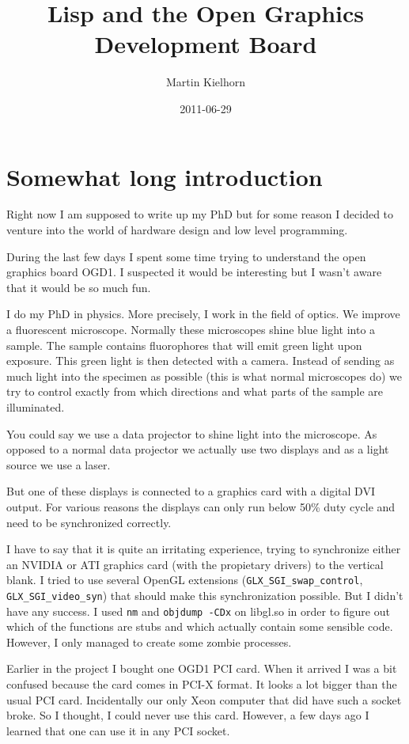 \documentclass[twocolumn,DIV19]{scrartcl}
\title{Lisp and the Open Graphics Development Board}
\author{Martin Kielhorn}
\date{2011-06-29}
\begin{document}
\maketitle 

\section{Somewhat long introduction}
Right now I am supposed to write up my PhD but for some reason I
decided to venture into the world of hardware design and low level
programming.

During the last few days I spent some time trying to understand the
open graphics board OGD1. I suspected it would be interesting but I
wasn't aware that it would be so much fun.

I do my PhD in physics. More precisely, I work in the field of
optics. We improve a fluorescent microscope. Normally these
microscopes shine blue light into a sample. The sample contains
fluorophores that will emit green light upon exposure. This green
light is then detected with a camera. Instead of sending as much light
into the specimen as possible (this is what normal microscopes do) we
try to control exactly from which directions and what parts of the
sample are illuminated.

You could say we use a data projector to shine light into the
microscope. As opposed to a normal data projector we actually use two
displays and as a light source we use a laser.

But one of these displays is connected to a graphics card with a
digital DVI output. For various reasons the displays can only run
below 50\% duty cycle and need to be synchronized correctly.

I have to say that it is quite an irritating experience, trying to
synchronize either an NVIDIA or ATI graphics card (with the propietary
drivers) to the vertical blank. I tried to use several OpenGL
extensions (\verb!GLX_SGI_swap_control!, \verb!GLX_SGI_video_syn!)
that should make this synchronization possible. But I didn't have any
success. I used \verb!nm! and \verb!objdump -CDx! on libgl.so in order
to figure out which of the functions are stubs and which actually
contain some sensible code. However, I only managed to create some
zombie processes.

Earlier in the project I bought one OGD1 PCI card. When it arrived I
was a bit confused because the card comes in PCI-X format. It looks a
lot bigger than the usual PCI card. Incidentally our only Xeon
computer that did have such a socket broke. So I thought, I could
never use this card. However, a few days ago I learned that one can
use it in any PCI socket.
\end{document}
